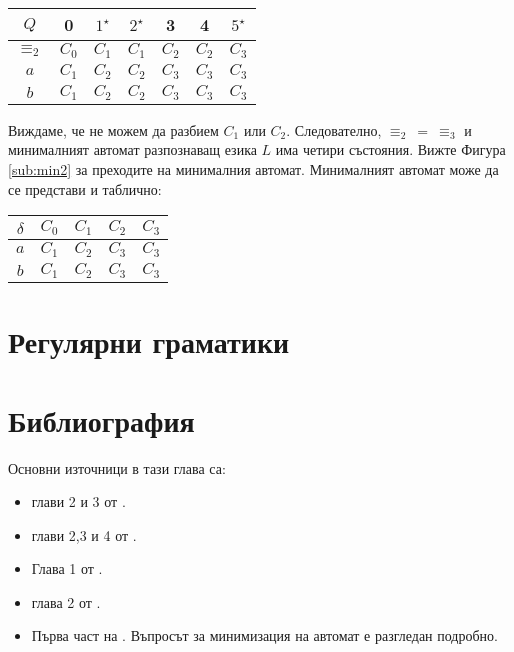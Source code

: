 \begin{example}
\begin{itemize}
      \begin{tabular}{|c|c|c|c|c|c|c|}
        \hline
        $Q$ & 0 & $1^\star$ & $2^\star$ & 3 & 4 & $5^\star$ \\
        \hline
        \hline
        $\equiv_2$ & $C_0$ & $C_1$ & $C_1$ & $C_2$ & $C_2$ & $C_3$\\
        \hline
        $a$ & $C_1$ & $C_2$ & $C_2$ & $C_3$ & $C_3$ & $C_3$\\
        \hline
        $b$ & $C_1$ & $C_2$ & $C_2$ & $C_3$ & $C_3$ & $C_3$\\
        \hline
      \end{tabular}
      
      Виждаме, че не можем да разбием $C_1$ или $C_2$.
      Следователно, $\equiv_2\ =\ \equiv_3$ и минималният автомат разпознаващ езика $L$
      има четири състояния. Вижте Фигура \ref{sub:min2} за преходите на минималния автомат.
      Минималният автомат може да се представи и таблично:

      \begin{tabular}{|c|c|c|c|c|}
        \hline
        $\delta$ & $C_0$ & $C_1$ & $C_2$ & $C_3$ \\
        \hline
        $a$ & $C_1$ & $C_2$ & $C_3$ & $C_3$ \\
        \hline
        $b$ & $C_1$ & $C_2$ & $C_3$ & $C_3$ \\
        \hline
      \end{tabular}
      
  \end{itemize}
\end{example}

\section{Регулярни граматики}
\section*{Библиография}

Основни източници в тази глава са:
\begin{itemize}
\item 
  глави 2 и 3 от \cite{hopcroft1}.
\item
  глави 2,3 и 4 от \cite{hopcroft2}.
\item
  Глава 1 от \cite{sipser1}.
\item
  глава 2 от \cite{papadimitriou}.
\item
  Първа част на \cite{kozen}. Въпросът за минимизация на автомат е разгледан подробно.
\end{itemize}

